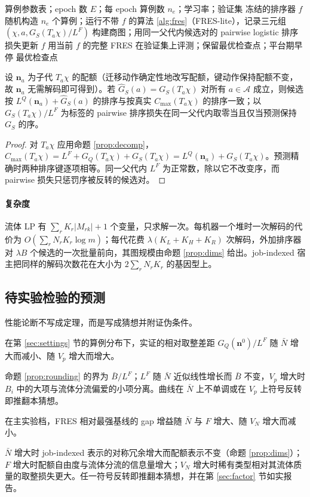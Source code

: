 \begin{algorithm}[htbp]
\caption{残差排序器的离线训练}\label{alg:train}
\begin{algorithmic}[1]
\Require 算例参数表；epoch 数 $E$；每 epoch 算例数 $n_e$；学习率；验证集
\Ensure 冻结的排序器 $f$
  \State 随机构造 $n_e$ 个算例；运行不带 $f$ 的算法 \ref{alg:fres}（FRES-lite），记录三元组 $(\chi, a, G_S(T_a\chi)/L^F)$
  \State 构建商图；用同一父代内候选对的 pairwise logistic 排序损失更新 $f$
  \State 用当前 $f$ 的完整 FRES 在验证集上评测；保留最优检查点；平台期早停
\EndFor
\State \Return 最优检查点
\end{algorithmic}
\end{algorithm}

\begin{proposition}[学习目标与模型目标一致]\label{prop:consistency}
设 $\mathbf{n}_a$ 为子代 $T_a\chi$ 的配额（迁移动作确定性地改写配额，键动作保持配额不变，故 $\mathbf{n}_a$ 无需解码即可得到）。若 $\hat G_S(a) = G_S(T_a\chi)$ 对所有 $a \in \mathcal{A}$ 成立，则候选按 $L^Q(\mathbf{n}_a) + \hat G_S(a)$ 的排序与按真实 $C_{\max}(T_a\chi)$ 的排序一致；以 $G_S(T_a\chi)/L^F$ 为标签的 pairwise 排序损失在同一父代内取零当且仅当预测保持 $G_S$ 的序。
\end{proposition}
\begin{proof}
对 $T_a\chi$ 应用命题 \ref{prop:decomp}，$C_{\max}(T_a\chi) = L^F + G_Q(T_a\chi) + G_S(T_a\chi) = L^Q(\mathbf{n}_a) + G_S(T_a\chi)$。预测精确时两种排序键逐项相等。同一父代内 $L^F$ 为正常数，除以它不改变序，而 pairwise 损失只惩罚序被反转的候选对。
\end{proof}

\paragraph{复杂度} 流体 LP 有 $\sum_r K_r \lvert M_{rk}\rvert + 1$ 个变量，只求解一次。每机器一个堆时一次解码的代价为 $O(\sum_r N_r K_r \log m)$；每代花费 $\lambda (K_L + K_H + K_R)$ 次解码，外加排序器对 $\lambda B$ 个候选的一次批量前向，其图规模由命题 \ref{prop:dims} 给出。job-indexed 宿主把同样的解码次数花在大小为 $2\sum_r N_r K_r$ 的基因型上。

\subsection{待实验检验的预测}\label{sec:predictions}
性能论断不写成定理，而是写成猜想并附证伪条件。

\begin{conjecture}[取整差距的符号]\label{conj:rounding}
在第 \ref{sec:settings} 节的算例分布下，实证的相对取整差距 $G_Q(\mathbf{n}^0)/L^F$ 随 $\bar N$ 增大而减小、随 $V_p$ 增大而增大。
\end{conjecture}
命题 \ref{prop:rounding} 的界为 $\bar B/L^F$；$L^F$ 随 $\bar N$ 近似线性增长而 $\bar B$ 不变，$V_p$ 增大时 $B_i$ 中的大项与流体分流偏爱的小项分离。曲线在 $\bar N$ 上不单调或在 $V_p$ 上符号反转即推翻本猜想。

\begin{conjecture}[增益的符号]\label{conj:gain}
在主实验档，FRES 相对最强基线的 gap 增益随 $\bar N$ 与 $F$ 增大、随 $V_N$ 增大而减小。
\end{conjecture}
$\bar N$ 增大时 job-indexed 表示的对称冗余增大而配额表示不变（命题 \ref{prop:dims}）；$F$ 增大时配额自由度与流体分流的信息量增大；$V_N$ 增大时稀有类型相对其流体质量的取整损失更大。任一符号反转即推翻本猜想，并在第 \ref{sec:factor} 节如实报告。
